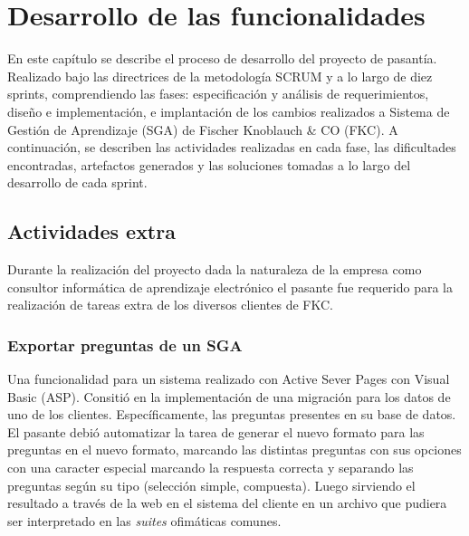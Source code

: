 \chapter{Desarrollo de las funcionalidades}
\thispagestyle{empty} %

En este capítulo se describe el proceso de desarrollo del proyecto de pasantía. Realizado bajo las directrices de la metodología SCRUM y a lo largo de diez sprints, comprendiendo las fases: especificación y análisis de requerimientos, diseño e implementación, e implantación de los cambios realizados a Sistema de Gestión de Aprendizaje (SGA) de Fischer Knoblauch \& CO (FKC). A continuación, se describen las actividades realizadas en cada fase, las dificultades encontradas, artefactos generados y las soluciones tomadas a lo largo del desarrollo de cada sprint.












\section{Actividades extra} %
\label{sec:actividades_extra}

Durante la realización del proyecto dada la naturaleza de la empresa como consultor informática de aprendizaje electrónico el pasante fue requerido para la realización de tareas extra de los diversos clientes de FKC.

	\subsection{Exportar preguntas de un SGA} %
	\label{sub:exportar_preguntas_de_un_sga}


	Una funcionalidad para un sistema realizado con Active Sever Pages con Visual Basic (ASP). Consitió en la implementación de una migración para los datos de uno de los clientes. Específicamente, las preguntas presentes en su base de datos. El pasante debió automatizar la tarea de generar el nuevo formato para las preguntas en el nuevo formato, marcando las distintas preguntas con sus opciones con una caracter especial marcando la respuesta correcta y separando las preguntas según su tipo (selección simple, compuesta). Luego sirviendo el resultado a través de la web en el sistema del cliente en un archivo que pudiera ser interpretado en las \emph{suites} ofimáticas comunes.

